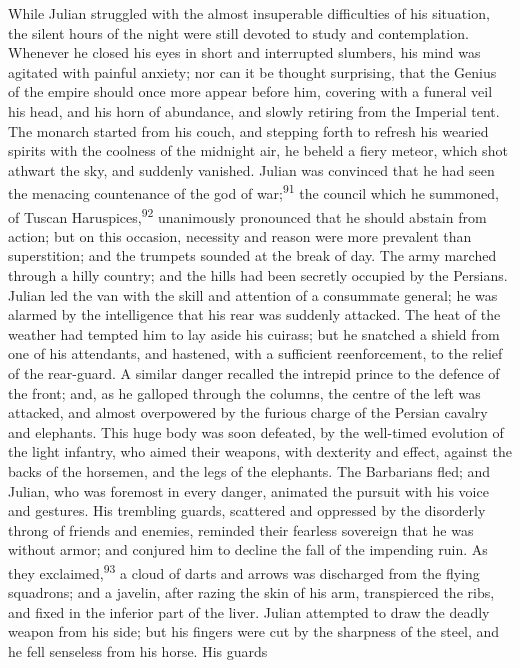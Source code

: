 While Julian struggled with the almost insuperable difficulties
of his situation, the silent hours of the night were still
devoted to study and contemplation. Whenever he closed his eyes
in short and interrupted slumbers, his mind was agitated with
painful anxiety; nor can it be thought surprising, that the
Genius of the empire should once more appear before him, covering
with a funeral veil his head, and his horn of abundance, and
slowly retiring from the Imperial tent. The monarch started from
his couch, and stepping forth to refresh his wearied spirits with
the coolness of the midnight air, he beheld a fiery meteor, which
shot athwart the sky, and suddenly vanished. Julian was convinced
that he had seen the menacing countenance of the god of war;\textsuperscript{91}
the council which he summoned, of Tuscan Haruspices,\textsuperscript{92}
unanimously pronounced that he should abstain from action; but on
this occasion, necessity and reason were more prevalent than
superstition; and the trumpets sounded at the break of day. The
army marched through a hilly country; and the hills had been
secretly occupied by the Persians. Julian led the van with the
skill and attention of a consummate general; he was alarmed by
the intelligence that his rear was suddenly attacked. The heat of
the weather had tempted him to lay aside his cuirass; but he
snatched a shield from one of his attendants, and hastened, with
a sufficient reenforcement, to the relief of the rear-guard. A
similar danger recalled the intrepid prince to the defence of the
front; and, as he galloped through the columns, the centre of the
left was attacked, and almost overpowered by the furious charge
of the Persian cavalry and elephants. This huge body was soon
defeated, by the well-timed evolution of the light infantry, who
aimed their weapons, with dexterity and effect, against the backs
of the horsemen, and the legs of the elephants. The Barbarians
fled; and Julian, who was foremost in every danger, animated the
pursuit with his voice and gestures. His trembling guards,
scattered and oppressed by the disorderly throng of friends and
enemies, reminded their fearless sovereign that he was without
armor; and conjured him to decline the fall of the impending
ruin. As they exclaimed,\textsuperscript{93} a cloud of darts and arrows was
discharged from the flying squadrons; and a javelin, after razing
the skin of his arm, transpierced the ribs, and fixed in the
inferior part of the liver. Julian attempted to draw the deadly
weapon from his side; but his fingers were cut by the sharpness
of the steel, and he fell senseless from his horse. His guards
